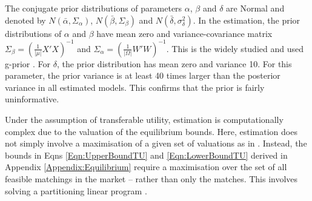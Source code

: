 
The conjugate prior distributions of parameters $\alpha$, $\beta$ and $\delta$ are Normal and denoted by $N(\bar \alpha, \Sigma_{\alpha})$, $N(\bar \beta, \Sigma_{\beta})$ and $N(\bar \delta, \sigma^2_{\delta})$. In the estimation, the prior distributions of $\alpha$ and $\beta$ have mean zero and variance-covariance matrix $\Sigma_\beta=(\frac{1}{|\mu|}X'X)^{-1}$ and $\Sigma_\alpha=(\frac{1}{|\Omega|}W'W)^{-1}$. This is the widely studied and used g-prior \citep{Zellner1986}. For $\delta$, the prior distribution has mean zero and variance 10. For this parameter, the prior variance is at least 40 times larger than the posterior variance in all estimated models. This confirms that the prior is fairly uninformative.

Under the assumption of transferable utility, estimation is computationally complex due to the valuation of the equilibrium bounds. Here, estimation does not simply involve a maximisation of a given set of valuations as in \citet{Klein2015a}. Instead, the bounds in Eqns \ref{Eqn:UpperBoundTU} and \ref{Eqn:LowerBoundTU} derived in Appendix \ref{Appendix:Equilibrium} require a maximisation over the set of all feasible matchings in the market -- rather than only the matches. This involves solving a partitioning linear program \citep[see][]{Quint1991}.

